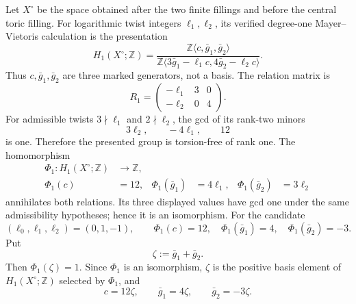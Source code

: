 Let $X^\circ$ be the space obtained after the two finite fillings and
before the central toric filling.  For logarithmic twist integers
\(\ell_1,\ell_2\), its verified degree-one Mayer--Vietoris calculation is
the presentation
\begin{equation}
 H_1(X^\circ;\mathbb Z)
 =\frac{\mathbb Z\langle c,\bar g_1,\bar g_2\rangle}
 {\mathbb Z\langle3\bar g_1-\ell_1c,
                         4\bar g_2-\ell_2c\rangle}.
 \label{zdc:eq:h1xcirc-presentation}
\end{equation}
Thus $c,\bar g_1,\bar g_2$ are three marked generators, not a basis.
The relation matrix is
\[
 R_1=
 \begin{pmatrix}-\ell_1&3&0\\-\ell_2&0&4\end{pmatrix}.
\]
For admissible twists $3\nmid\ell_1$ and $2\nmid\ell_2$, the gcd of
its rank-two minors
\[
 3\ell_2,\qquad-4\ell_1,\qquad12
\]
is one.  Therefore the presented group is torsion-free of rank one.  The
homomorphism
\begin{equation}
 \begin{aligned}
 \Phi_1:H_1(X^\circ;\mathbb Z)&\longrightarrow\mathbb Z,\\
 \Phi_1(c)&=12,&
 \Phi_1(\bar g_1)&=4\ell_1,&
 \Phi_1(\bar g_2)&=3\ell_2
 \end{aligned}
 \label{zdc:eq:phi1}
\end{equation}
annihilates both relations.  Its three displayed values have gcd one under
the same admissibility hypotheses; hence it is an isomorphism.  For the
candidate
\begin{equation}
 (\ell_0,\ell_1,\ell_2)=(0,1,-1),
 \qquad
 \Phi_1(c)=12,\quad
 \Phi_1(\bar g_1)=4,\quad
 \Phi_1(\bar g_2)=-3.
 \label{zdc:eq:candidate-twists}
\end{equation}
Put
\begin{equation}
 \zeta:=\bar g_1+\bar g_2.
 \label{zdc:eq:zeta-generator}
\end{equation}
Then $\Phi_1(\zeta)=1$.  Since $\Phi_1$ is an isomorphism, $\zeta$ is the
positive basis element of $H_1(X^\circ;\mathbb Z)$ selected by $\Phi_1$, and
\begin{equation}
 c=12\zeta,\qquad \bar g_1=4\zeta,\qquad \bar g_2=-3\zeta.
 \label{zdc:eq:presentation-to-basis}
\end{equation}

